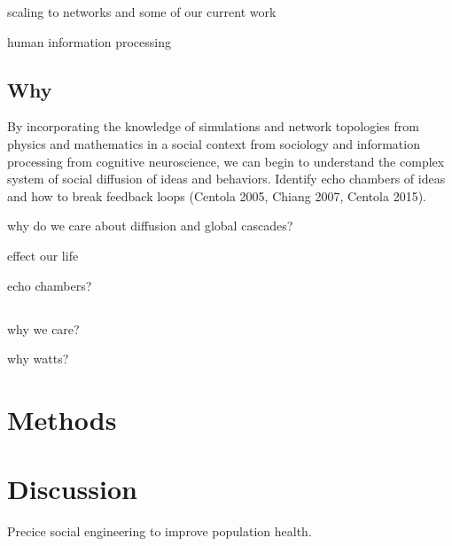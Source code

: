 \documentclass[10pt,letterpaper]{article}
\begin{document}
\hrulefill

scaling to networks and some of our current work

human information processing

\subsection{Why}

By incorporating the knowledge of simulations and network topologies from physics and mathematics
in a social context from sociology and information processing from cognitive neuroscience,
we can begin to understand the complex system of social diffusion of ideas and behaviors.
Identify echo chambers of ideas and how to break feedback loops
(Centola 2005, Chiang 2007, Centola 2015).

\hrulefill

why do we care about diffusion and global cascades?

effect our life

echo chambers?

\subsection{}

why we care?

why watts?

\section{Methods}

\section{Discussion}

Precice social engineering to improve population health.
\end{document}
